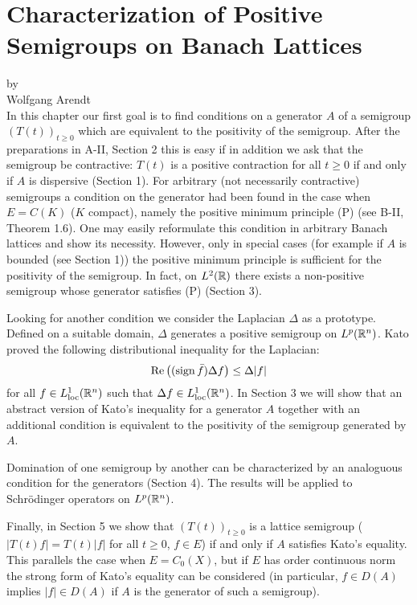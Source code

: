 \setcounter{chapter}{1}
\chapter{Characterization of Positive Semigroups on Banach Lattices}\label{chap:c2}
%
{\Large
\vspace*{-.75cm}
by \\[.25em]
Wolfgang Arendt
\vspace{.75cm}
\\
}
In this chapter our first goal is to find conditions on a generator $A$ of a semigroup $(T(t))_{t \geq 0}$ which are equivalent to the positivity of the semigroup.
After the preparations in A-II, Section 2 this is easy if in addition we ask that the semigroup be contractive: $T(t)$ is a positive contraction for all $t \geq 0$ if and only if $A$ is dispersive (Section 1).
For arbitrary (not necessarily contractive) semigroups a condition on the generator had been found in the case when $E = C(K)$ ($K$ compact), namely the positive minimum principle (P) (see B-II, Theorem 1.6).
One may easily reformulate this condition in arbitrary Banach lattices and show its necessity.
However, only in special cases (for example if $A$ is bounded (see Section 1)) the positive minimum principle is sufficient for the positivity of the semigroup.
In fact, on $L^{2}(\mathbb{R})$ there exists a non-positive semigroup whose generator satisfies (P) (Section 3).

Looking for another condition we consider the Laplacian $\Delta$ as a prototype.
Defined on a suitable domain, $\Delta$ generates a positive semigroup on $L^p(\mathbb{R}^n)$.
Kato proved the following distributional inequality for the Laplacian:
\[
\mathop{}\!\mathrm{Re} \left( (\operatorname{sign} \bar{f}) \Delta f \right) \leq \Delta|f|
\]
for all $f \in L^1_{\text{loc}}(\mathbb{R}^{n})$ such that $\Delta f \in L^1_{\text{loc}}(\mathbb{R}^{n})$.
In Section 3 we will show that an abstract version of Kato's inequality for a generator $A$ together with an additional condition is equivalent to the positivity of the semigroup generated by $A$.

Domination of one semigroup by another can be characterized by an analoguous condition for the generators (Section 4).
The results will be applied to Schrödinger operators on $L^p(\mathbb{R}^n)$.

Finally, in Section 5 we show that $(T(t))_{t \geq 0}$ is a lattice semigroup (\ie $|T(t) f| = T(t) |f|$ for all $t \geq 0$, $f \in E$) if and only if $A$ satisfies Kato's equality.
This parallels the case when $E = C_{0}(X)$, but if $E$ has order continuous norm the strong form of Kato's equality can be considered (in particular, $f \in D(A)$ implies $|f| \in D(A)$ if $A$ is the generator of such a semigroup).
